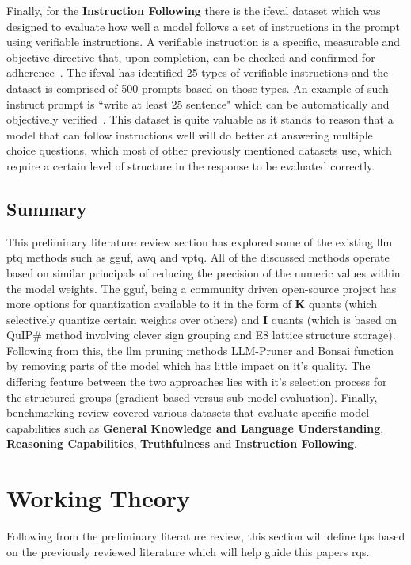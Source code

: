 \documentclass{ifacconf}
\begin{document}
	Finally, for the \textbf{Instruction Following} there is the \gls{ifeval} dataset which was designed to evaluate how well a model follows a set of instructions in the prompt using verifiable instructions. A verifiable instruction is a specific, measurable and objective directive that, upon completion, can be checked and confirmed for adherence~\cite{zhou2023instructionfollowingevaluationlargelanguage}. The \gls{ifeval} has identified 25 types of verifiable instructions and the dataset is comprised of 500 prompts based on those types. An example of such instruct prompt is ``write at least 25 sentence" which can be automatically and objectively verified~\cite{zhou2023instructionfollowingevaluationlargelanguage}. This dataset is quite valuable as it stands to reason that a model that can follow instructions well will do better at answering multiple choice questions, which most of other previously mentioned datasets use, which require a certain level of structure in the response to be evaluated correctly.
	
	\subsection{Summary}
	This preliminary literature review section has explored some of the existing \gls{llm} \gls{ptq} methods such as \gls{gguf}, \gls{awq} and \gls{vptq}. All of the discussed methods operate based on similar principals of reducing the precision of the numeric values within the model weights. The \gls{gguf}, being a community driven open-source project has more options for quantization available to it in the form of \textbf{K} quants (which selectively quantize certain weights over others) and \textbf{I} quants (which is based on QuIP\# method involving clever sign grouping and E8 lattice structure storage). Following from this, the \gls{llm} pruning methods LLM-Pruner and Bonsai function by removing parts of the model which has little impact on it's quality. The differing feature between the two approaches lies with it's selection process for the structured groups (gradient-based versus sub-model evaluation). Finally, benchmarking review covered various datasets that evaluate specific model capabilities such as \textbf{General Knowledge and Language Understanding}, \textbf{Reasoning Capabilities}, \textbf{Truthfulness} and \textbf{Instruction Following}. 
	
	\section{Working Theory}
	Following from the preliminary literature review, this section will define \glspl{tp} based on the previously reviewed literature which will help guide this papers \glspl{rq}.
	
\end{document}
